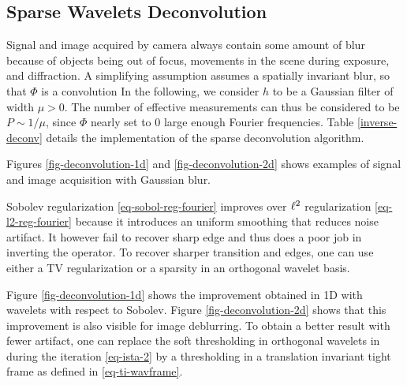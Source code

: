 

\subsection{Sparse Wavelets Deconvolution}


Signal and image acquired by camera always contain some amount of blur because of objects being out of focus, movements in the scene during exposure, and diffraction. A simplifying assumption assumes a spatially invariant blur, so that $\Phi$ is a convolution
In the following, we consider $h$ to be a Gaussian filter of width $\mu > 0$. The number of effective measurements can thus be considered to be $P \sim 1/\mu$, since $\Phi$ nearly set to 0 large enough Fourier frequencies. Table \ref{inverse-deconv} details the implementation of the sparse deconvolution algorithm.

Figures \ref{fig-deconvolution-1d} and \ref{fig-deconvolution-2d} shows examples of signal and image acquisition with Gaussian blur. 

Sobolev regularization \eqref{eq-sobol-reg-fourier} improves over $\ell^2$ regularization \eqref{eq-l2-reg-fourier} because it introduces an uniform smoothing that reduces noise artifact. It however fail to recover sharp edge and thus does a poor job in inverting the operator. To recover sharper transition and edges, one can use either a TV regularization or a sparsity in an orthogonal wavelet basis. 

Figure \ref{fig-deconvolution-1d} shows the improvement obtained in 1D with wavelets with respect to Sobolev. Figure \ref{fig-deconvolution-2d} shows that this improvement is also visible for image deblurring. To obtain a better result with fewer artifact, one can replace the soft thresholding in orthogonal wavelets in during the iteration \eqref{eq-ista-2} by a thresholding in a translation invariant tight frame as defined in \eqref{eq-ti-wavframe}.



